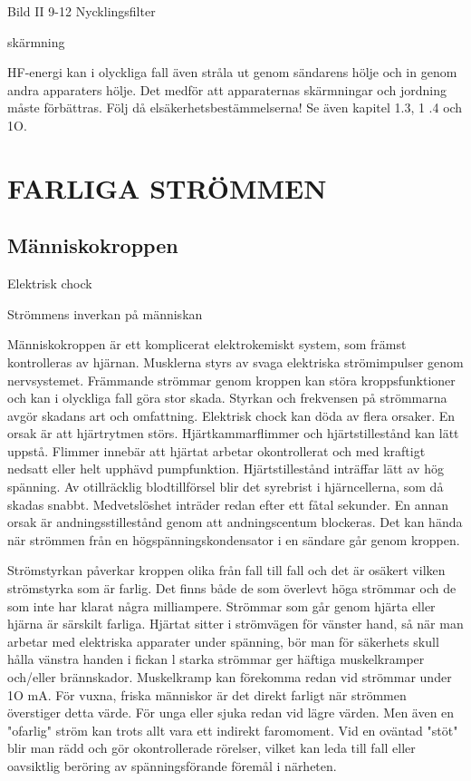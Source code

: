 \documentclass[a4paper,twoside,twocolumn,openright]{book}
\begin{document}
{{{{{Bild II 9-12 Nycklingsfilter

skärmning

HF-energi kan i olyckliga fall även stråla ut
genom sändarens hölje och in genom andra
apparaters hölje. Det medför att apparaternas skärmningar och jordning måste förbättras. Följ då elsäkerhetsbestämmelserna!
Se även kapitel 1.3, 1 .4 och 1O.

\chapter{FARLIGA STRÖMMEN}

\section{Människokroppen}

Elektrisk chock

Strömmens inverkan på människan

Människokroppen är ett komplicerat elektrokemiskt system, som främst kontrolleras av
hjärnan. Musklerna styrs av svaga elektriska
strömimpulser genom nervsystemet. Främmande strömmar genom kroppen kan störa
kroppsfunktioner och kan i olyckliga fall göra
stor skada. Styrkan och frekvensen på strömmarna avgör skadans art och omfattning.
Elektrisk chock kan döda av flera orsaker.
En orsak är att hjärtrytmen störs. Hjärtkammarflimmer och hjärtstillestånd kan lätt
uppstå. Flimmer innebär att hjärtat arbetar
okontrollerat och med kraftigt nedsatt eller
helt upphävd pumpfunktion. Hjärtstillestånd
inträffar lätt av hög spänning. Av otillräcklig
blodtillförsel blir det syrebrist i hjärncellerna,
som då skadas snabbt. Medvetslöshet inträder redan efter ett fåtal sekunder.
En annan orsak är andningsstillestånd
genom att andningscentum blockeras. Det
kan hända när strömmen från en högspänningskondensator i en sändare går genom
kroppen.

Strömstyrkan påverkar kroppen olika från
fall till fall och det är osäkert vilken strömstyrka som är farlig. Det finns både de som
överlevt höga strömmar och de som inte har
klarat några milliampere. Strömmar som går
genom hjärta eller hjärna är särskilt farliga.
Hjärtat sitter i strömvägen för vänster hand,
så när man arbetar med elektriska apparater
under spänning, bör man för säkerhets skull
hålla vänstra handen i fickan l
starka strömmar ger häftiga muskelkramper och/eller brännskador. Muskelkramp kan
förekomma redan vid strömmar under 1O
mA. För vuxna, friska människor är det direkt
farligt när strömmen överstiger detta värde.
För unga eller sjuka redan vid lägre värden.
Men även en "ofarlig" ström kan trots allt
vara ett indirekt faromoment. Vid en oväntad
"stöt" blir man rädd och gör okontrollerade
rörelser, vilket kan leda till fall eller oavsiktlig
beröring av spänningsförande föremål i närheten.

}}}}}
\end{document}
